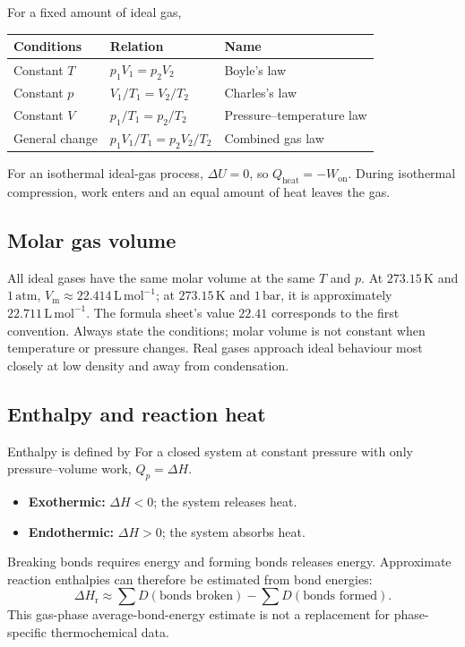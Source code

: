 \documentclass[a4paper,10pt]{article}
\newcommand{\chemunit}[1]{\,\mathrm{#1}}
\begin{document}
For a fixed amount of ideal gas,
\begin{center}
\begin{tabular}{@{}lll@{}}
\toprule
Conditions & Relation & Name \\
\midrule
Constant $T$ & $p_1V_1=p_2V_2$ & Boyle's law \\
Constant $p$ & $V_1/T_1=V_2/T_2$ & Charles's law \\
Constant $V$ & $p_1/T_1=p_2/T_2$ & Pressure--temperature law \\
General change & $p_1V_1/T_1=p_2V_2/T_2$ & Combined gas law \\
\bottomrule
\end{tabular}
\end{center}
For an isothermal ideal-gas process, $\Delta U=0$, so
$Q_{\mathrm{heat}}=-W_{\mathrm{on}}$. During isothermal compression, work enters
and an equal amount of heat leaves the gas.

\subsection{Molar gas volume}
All ideal gases have the same molar volume at the same $T$ and $p$.
At $273.15\chemunit K$ and $1\chemunit{atm}$, $V_{\mathrm m}\approx22.414\chemunit{L\,mol^{-1}}$;
at $273.15\chemunit K$ and $1\chemunit{bar}$, it is approximately
$22.711\chemunit{L\,mol^{-1}}$. The formula sheet's value $22.41$ corresponds to
the first convention. Always state the conditions; molar volume is not constant
when temperature or pressure changes. Real gases approach ideal behaviour most
closely at low density and away from condensation.

\subsection{Enthalpy and reaction heat}
Enthalpy is defined by
For a closed system at constant pressure with only pressure--volume work,
$Q_p=\Delta H$.
\begin{itemize}
  \item \textbf{Exothermic:} $\Delta H<0$; the system releases heat.
  \item \textbf{Endothermic:} $\Delta H>0$; the system absorbs heat.
\end{itemize}
Breaking bonds requires energy and forming bonds releases energy. Approximate
reaction enthalpies can therefore be estimated from bond energies:
\[
 \Delta H_{\mathrm r}\approx
 \sum D(\text{bonds broken})-\sum D(\text{bonds formed}).
\]
This gas-phase average-bond-energy estimate is not a replacement for
phase-specific thermochemical data.
\end{document}
